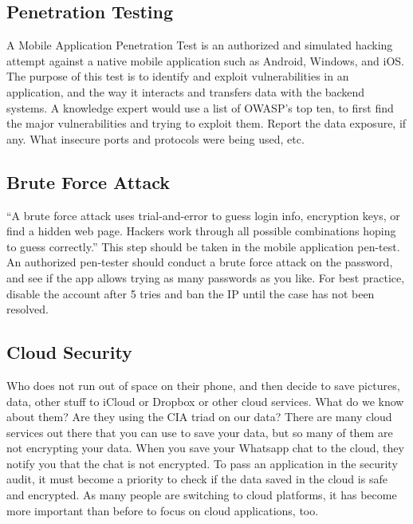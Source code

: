 \documentclass{article}
\begin{document}
\subsection{Penetration Testing}
A Mobile Application Penetration Test is an authorized and simulated hacking attempt against a native mobile application such as Android, Windows, and iOS. The purpose of this test is to identify and exploit vulnerabilities in an application, and the way it interacts and transfers data with the backend systems. A knowledge expert would use a list of OWASP's top ten, to first find the major vulnerabilities and trying to exploit them. Report the data exposure, if any. What insecure ports and protocols were being used, etc.\\
\subsection{Brute Force Attack}
“A brute force attack uses trial-and-error to guess login info, encryption keys, or find a hidden web page. Hackers work through all possible combinations hoping to guess correctly.” This step should be taken in the mobile application pen-test. An authorized pen-tester should conduct a brute force attack on the password, and see if the app allows trying as many passwords as you like. For best practice, disable the account after 5 tries and ban the IP until the case has not been resolved.\\
\subsection{Cloud Security}
Who does not run out of space on their phone, and then decide to save pictures, data, other stuff to iCloud or Dropbox or other cloud services. What do we know about them? Are they using the CIA triad on our data? There are many cloud services out there that you can use to save your data, but so many of them are not encrypting your data. When you save your Whatsapp chat to the cloud, they notify you that the chat is not encrypted. To pass an application in the security audit, it must become a priority to check if the data saved in the cloud is safe and encrypted. As many people are switching to cloud platforms, it has become more important than before to focus on cloud applications, too.\\
\vspace{100mm}
\end{document}
